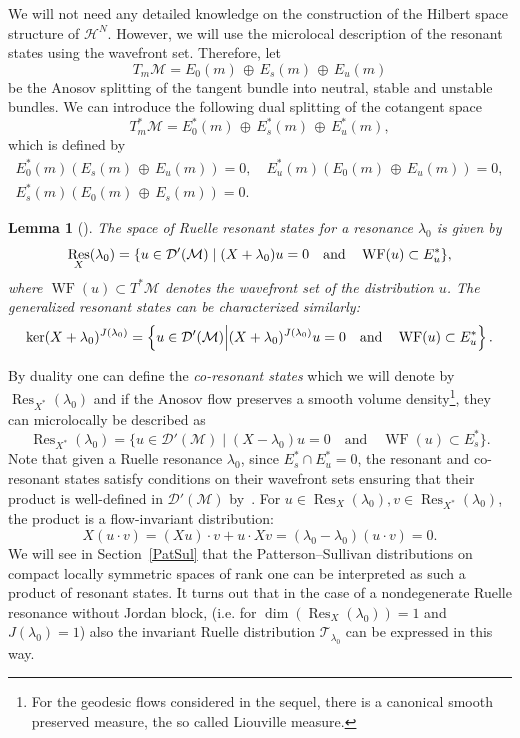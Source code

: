 \documentclass[10pt]{amsart}
\newtheorem{lemm}[cdrthm]{Lemma}
\theoremstyle{definition}
\DeclareMathOperator{\WF}{WF}
\DeclareMathOperator{\Res}{Res}
\newcommand{\mc}{\mathcal}
\begin{document}
We will not need any detailed knowledge on the construction of the Hilbert space structure of $\mc{H}^N$. However, we will use the microlocal description of the resonant states using the wavefront set. Therefore, let
\[
T_m \mathcal M = E_0(m)\,\oplus\,E_s(m)\,\oplus\,E_u(m)
\]
be the Anosov splitting of the tangent bundle into neutral, stable and unstable bundles. We can introduce the following dual splitting of the cotangent space
\[
T^*_m\mathcal M = E_0^*(m)\,\oplus\,E_s^*(m)\,\oplus\, E_u^*(m),
\]
which is defined by
\[
\begin{gathered}
E^*_0(m)(E_s(m)\,\oplus\,E_u(m))=0,\quad E^*_u(m)(E_0(m)\,\oplus\,E_u(m))=0,\\
E^*_s(m)(E_0(m)\,\oplus\,E_s(m))=0.
\end{gathered}
\]

\begin{lemm}[{\cite[Lemma~5.1]{DFG15}}]\label{lem:microlocal_res_state}
The space of Ruelle resonant states for a resonance $\lambda_0$ is given by
\begin{equation}\label{eq:microlocal_res_state}
\Res_{X}(\lambda_0) = \{u\in \mathcal D'(\mathcal M)\mid(X+\lambda_0)u=0\quad
\text{\rm and}\quad\WF(u)\subset E^*_u \},
\end{equation}
where ${\WF}(u)\subset T^*\mc{M}$ denotes the wavefront set of the distribution $u$. The generalized resonant states can be characterized similarly:
\begin{equation}\label{eq:microlocal_gen_res_state}
\ker(X+\lambda_0)^{J(\lambda_0)} = \left\{u\in \mathcal D'(\mathcal M)\middle|(X+\lambda_0)^{J(\lambda_0)}u=0 \quad \text{\rm and}\quad\WF(u)\subset E^*_u \right\}.
\end{equation}
\end{lemm}

\goodbreak
By duality one can define the \emph{co-resonant states} which we will denote by $\Res_{X^*}(\lambda_0)$ and if the Anosov flow preserves a smooth volume density\footnote{For the geodesic flows considered in the sequel, there is a canonical smooth preserved measure, the so called Liouville measure.}, they can microlocally be described as
\begin{equation}\label{eq:microlocal_cores_state}
\Res_{X^*}(\lambda_0) = \{u\in \mathcal D'(\mathcal M)\mid (X- \lambda_0)u=0 \quad\text{and}\quad\WF(u)\subset E^*_s \}.
\end{equation}
Note that given a Ruelle resonance $\lambda_0$, since $E_s^*\cap E_u^*=0$, the resonant and co-resonant states satisfy conditions on their wavefront sets ensuring that their product is well-defined in $\mc{D}'(\mc{M})$ by~\cite[Theorem~8.2.10]{HoeI}. For $u\in \Res_{X}(\lambda_0), v\in \Res_{X^*}(\lambda_0)$, the product is a flow-invariant distribution:
\[
X(u\cdot v) = (X u)\cdot v + u\cdot X v = (\lambda_0-\lambda_0)(u\cdot v)=0.
\]
We will see in Section~\ref{PatSul} that the Patterson--Sullivan distributions on compact locally symmetric spaces of rank one can be interpreted as such a product of resonant states. It turns out that in the case of a nondegenerate Ruelle resonance without Jordan block, (i.e. for $\dim(\Res_{X}(\lambda_0)) = 1$ and $J(\lambda_0)=1$) also the invariant Ruelle distribution $\mathcal T_{\lambda_0}$ can be expressed in this way.
\end{document}

